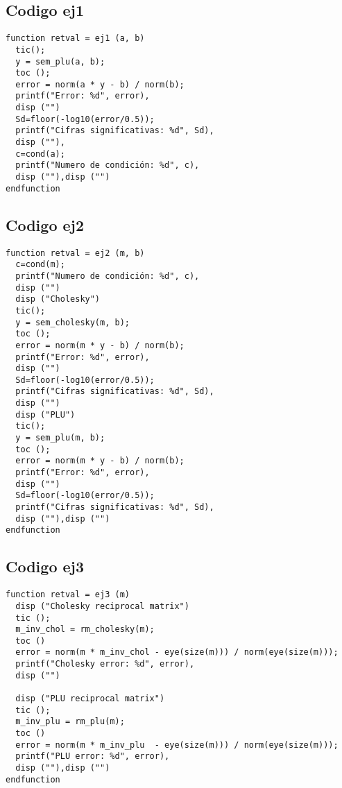 \documentclass[10pt]{article}
\begin{document}
{}
\subsection*{Codigo ej1}

\begin{lstlisting}
function retval = ej1 (a, b)
  tic();
  y = sem_plu(a, b);
  toc ();
  error = norm(a * y - b) / norm(b);
  printf("Error: %d", error),
  disp ("")
  Sd=floor(-log10(error/0.5));
  printf("Cifras significativas: %d", Sd), 
  disp (""),
  c=cond(a);
  printf("Numero de condición: %d", c), 
  disp (""),disp ("")
endfunction
\end{lstlisting}


{}
\subsection*{Codigo ej2}

\begin{lstlisting}
function retval = ej2 (m, b)
  c=cond(m);
  printf("Numero de condición: %d", c), 
  disp ("")
  disp ("Cholesky")
  tic();
  y = sem_cholesky(m, b);
  toc ();
  error = norm(m * y - b) / norm(b);
  printf("Error: %d", error),
  disp ("")
  Sd=floor(-log10(error/0.5));
  printf("Cifras significativas: %d", Sd),
  disp ("")
  disp ("PLU")
  tic();
  y = sem_plu(m, b);
  toc ();
  error = norm(m * y - b) / norm(b);
  printf("Error: %d", error),
  disp ("")
  Sd=floor(-log10(error/0.5));
  printf("Cifras significativas: %d", Sd),
  disp (""),disp ("")
endfunction
\end{lstlisting}


{}
\subsection*{Codigo ej3}

\begin{lstlisting}
function retval = ej3 (m)
  disp ("Cholesky reciprocal matrix")
  tic ();
  m_inv_chol = rm_cholesky(m);
  toc ()
  error = norm(m * m_inv_chol - eye(size(m))) / norm(eye(size(m)));
  printf("Cholesky error: %d", error),
  disp ("")
  
  disp ("PLU reciprocal matrix")
  tic ();
  m_inv_plu = rm_plu(m);
  toc ()
  error = norm(m * m_inv_plu  - eye(size(m))) / norm(eye(size(m)));
  printf("PLU error: %d", error), 
  disp (""),disp ("")
endfunction
\end{lstlisting}
\end{document}
